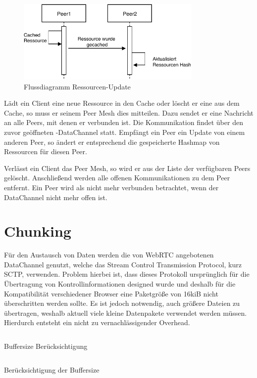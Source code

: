 \begin{figure}[!h]
	\centering
	\includegraphics[width=0.8\textwidth]{figures/Ressourcen_update}
	\caption[Flussdiagramm Ressourcen-Update]{Flussdiagramm Ressourcen-Update}
	\label{fig:update_resource}
\end{figure}

Lädt ein Client eine neue Ressource in den Cache oder löscht er eine aus dem Cache, so muss er seinem Peer Mesh dies mitteilen. Dazu sendet er eine Nachricht an alle Peers, mit denen er verbunden ist. Die Kommunikation findet über den zuvor geöffneten \webrtc-DataChannel statt. Empfängt ein Peer ein Update von einem anderen Peer, so ändert er entsprechend die gespeicherte Hashmap von Ressourcen für diesen Peer.

Verlässt ein Client das Peer Mesh, so wird er aus der Liste der verfügbaren Peers gelöscht. Anschließend werden alle offenen Kommunikationen zu dem Peer entfernt. Ein Peer wird als nicht mehr verbunden betrachtet, wenn der DataChannel nicht mehr offen ist.


\section{Chunking} \label{i:chunking}
Für den Austausch von Daten werden die von WebRTC angebotenen DataChannel genutzt, welche das Stream Control Transmission Protocol, kurz SCTP, verwenden. Problem hierbei ist, dass dieses Protokoll ursprünglich für die Übertragung von Kontrollinformationen designed wurde und deshalb für die Kompatibilität verschiedener Browser eine Paketgröße von 16kiB nicht überschritten werden sollte. Es ist jedoch notwendig, auch größere Dateien zu übertragen, weshalb aktuell viele kleine Datenpakete verwendet werden müssen. Hierdurch entsteht ein nicht zu vernachlässigender Overhead.

\begin{listing}[h]
	\inputminted{javascript}{listings/buffersize.js}
	\caption{Buffersize Berücksichtigung}
	\label{lst:code-buffersize}
\end{listing}
\begin{listing}[h]
	\inputminted{javascript}{listings/handle_chunk.js}
	\caption{Berücksichtigung der Buffersize}
	\label{lst:code-handle-chunk}
\end{listing}

